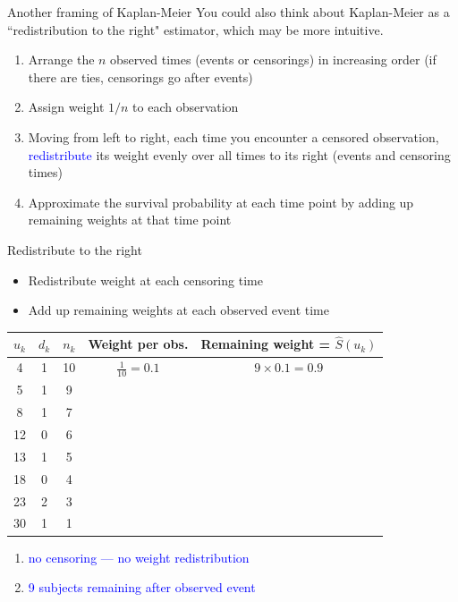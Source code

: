 \documentclass[10pt,t]{beamer}
\begin{document}
\begin{frame}{Another framing of Kaplan-Meier}
	You could also think about Kaplan-Meier as a ``redistribution to the right" estimator, which may be more intuitive. 
	\begin{enumerate}
		\item Arrange the $n$ observed times (events or censorings) in increasing order (if there are ties, censorings go after events)
		\item Assign weight $1/n$ to each observation
		\item Moving from left to right, each time you encounter a censored observation, \textcolor{blue}{redistribute} its weight evenly over all times to its right (events and censoring times)
		\item Approximate the survival probability at each time point by adding up remaining weights at that time point
	\end{enumerate}
\end{frame}

\begin{frame}{Redistribute to the right}
	\begin{itemize}
		\item Redistribute weight at each censoring time
		\item Add up remaining weights at each observed event time
	\end{itemize}
	\begin{footnotesize}
		\begin{tabular}{|c|c|c|c|c|}
			\hline
			$u_k$ & $d_k$ & $n_k$ & Weight per obs. & Remaining weight = $\widehat{S}(u_k)$ \\
			\hline
			4 & 1 & 10 & $\frac{1}{10} = 0.1$ & $9\times 0.1= 0.9$\\
			5 & 1 & 9 & & \\
			8 & 1 & 7 & & \\
			12 & 0 & 6 & & \\
			13 & 1 & 5 & & \\
			18 & 0 & 4 & & \\
			23 & 2 & 3 & & \\
			30 & 1 & 1 & & \\
			\hline
		\end{tabular}
	\end{footnotesize}
	\begin{enumerate}
		\item \textcolor{blue}{no censoring --- no weight redistribution}
		\item \textcolor{blue}{9 subjects remaining after observed event}
	\end{enumerate}
\end{frame}
\end{document}

